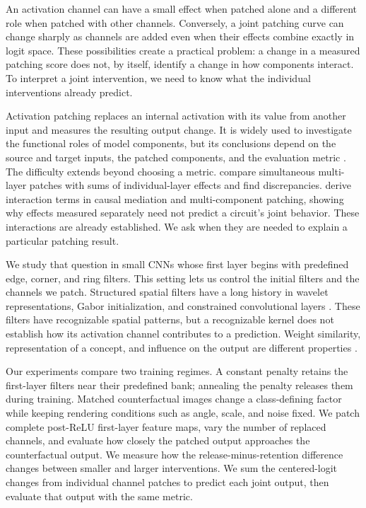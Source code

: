 \documentclass[pdflatex,sn-basic]{sn-jnl}
\begin{document}
An activation channel can have a small effect when patched alone and a different role when patched with other channels. Conversely, a joint patching curve can change sharply as channels are added even when their effects combine exactly in logit space. These possibilities create a practical problem: a change in a measured patching score does not, by itself, identify a change in how components interact. To interpret a joint intervention, we need to know what the individual interventions already predict.

Activation patching replaces an internal activation with its value from another input and measures the resulting output change. It is widely used to investigate the functional roles of model components, but its conclusions depend on the source and target inputs, the patched components, and the evaluation metric \citep{heimersheim_2024_activation-patching,zhang_2024_activation-patching,miller_2024_circuit-faithfulness}. The difficulty extends beyond choosing a metric. \citet{zhang_2024_activation-patching} compare simultaneous multi-layer patches with sums of individual-layer effects and find discrepancies. \citet{vaidyanathan_2026_multiple-mediators} derive interaction terms in causal mediation and multi-component patching, showing why effects measured separately need not predict a circuit's joint behavior. These interactions are already established. We ask when they are needed to explain a particular patching result.

We study that question in small CNNs whose first layer begins with predefined edge, corner, and ring filters. This setting lets us control the initial filters and the channels we patch. Structured spatial filters have a long history in wavelet representations, Gabor initialization, and constrained convolutional layers \citep{bruna_2013_scattering-networks,ozbulak_2018_gabor-initialization,molaei_2020_gabor-filter-structure,wang_2024_learnable-gabor,linse_2024_predefined-filters,orozco-solis_2024_learnable-gabor-filters}. These filters have recognizable spatial patterns, but a recognizable kernel does not establish how its activation channel contributes to a prediction. Weight similarity, representation of a concept, and influence on the output are different properties \citep{kim_2018_tcav,koh_2020_concept-bottlenecks,margeloiu_2021_concept-bottleneck-alignment,nicolson_2025_explaining-explainability,sharma_2026_encoding-without-influence}.

Our experiments compare two training regimes. A constant penalty retains the first-layer filters near their predefined bank; annealing the penalty releases them during training. Matched counterfactual images change a class-defining factor while keeping rendering conditions such as angle, scale, and noise fixed. We patch complete post-ReLU first-layer feature maps, vary the number of replaced channels, and evaluate how closely the patched output approaches the counterfactual output. We measure how the release-minus-retention difference changes between smaller and larger interventions. We sum the centered-logit changes from individual channel patches to predict each joint output, then evaluate that output with the same metric.
\end{document}
